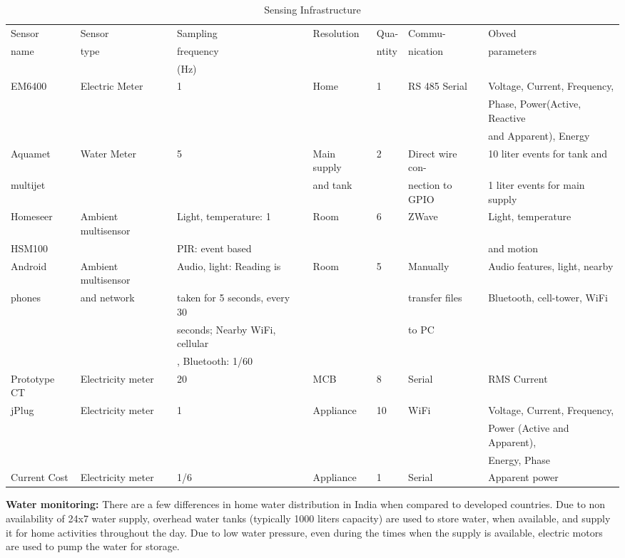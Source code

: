 \documentclass[10pt]{sensys-proc}
\begin{document}
\begin{table}[t!]
\vspace{-4mm}
\caption{Sensing Infrastructure}
\vspace{-4mm}
\label{tab:sensing}
\tabcolsep=0.015cm
\begin{tabular}{|l|l|l|l|l|l|l|}
\hline
Sensor&Sensor&Sampling&Resolution&Qua-&Commu-&Obved\\
name&type&frequency&&ntity&nication&parameters\\
&&(Hz)&&&&\\
\hline

EM6400&Electric Meter&1&Home&1&RS 485 Serial&Voltage, Current, Frequency,\\ 
&&&&&&Phase, Power(Active, Reactive \\ 
&&&&&&and Apparent), Energy\\ \hline
Aquamet &Water Meter&5&Main supply&2&Direct wire con-&10 liter events for tank and \\ 
multijet&&& and tank&&nection to GPIO&1 liter events for main supply\\ \hline
Homeseer &Ambient multisensor&Light, temperature: 1&Room &6&ZWave&Light, temperature\\ 
     HSM100           &&PIR: event based&&&& and motion\\ \hline
Android&Ambient multisensor&Audio, light: Reading is &Room&5&Manually&Audio features, light, nearby \\ 
phones&and network&taken for 5 seconds, every 30 &&&transfer files&Bluetooth, cell-tower, WiFi\\ 
&&seconds; Nearby WiFi, cellular&&&to PC&\\ 
&&, Bluetooth: 1/60&&&&\\ \hline
Prototype CT&Electricity meter&20&MCB&8&Serial&RMS Current \\\hline
jPlug&Electricity meter & 1 &Appliance&10&WiFi&Voltage, Current, Frequency,\\ 
&&&&&&Power (Active and Apparent),\\
&&&&&& Energy, Phase\\ \hline	
Current Cost&Electricity meter&1/6&Appliance&1&Serial&Apparent power\\ \hline


\end{tabular}


\end{table}
\noindent \textbf{Water monitoring:} There are a few differences in home water distribution in India when compared to developed countries. Due to non availability of 24x7 water supply, overhead water tanks (typically 1000 liters capacity) are used to store water, when available, and supply it for home activities throughout the day. Due to low water pressure, even during the times when the supply is available, electric motors are used to pump the water for storage. %
\end{document}
